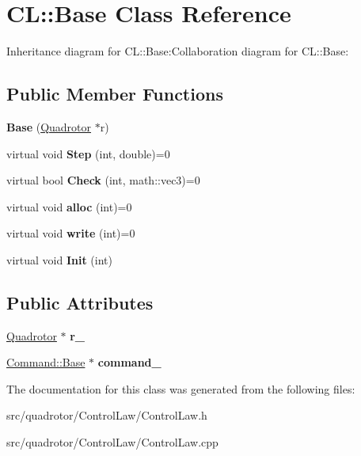 \hypertarget{classCL_1_1Base}{
\section{CL::Base Class Reference}
\label{classCL_1_1Base}
}
Inheritance diagram for CL::Base:Collaboration diagram for CL::Base:\subsection*{Public Member Functions}
\begin{DoxyCompactItemize}
\item 
\hypertarget{classCL_1_1Base_ad8db38f548637316213cd109aed97792}{
{\bfseries Base} (\hyperlink{classQuadrotor}{Quadrotor} $\ast$r)}
\label{classCL_1_1Base_ad8db38f548637316213cd109aed97792}

\item 
\hypertarget{classCL_1_1Base_a08bb880fc7c5f5c81ee77eaa9570c32a}{
virtual void {\bfseries Step} (int, double)=0}
\label{classCL_1_1Base_a08bb880fc7c5f5c81ee77eaa9570c32a}

\item 
\hypertarget{classCL_1_1Base_a3de68eff20bc897fea32c758bff81d03}{
virtual bool {\bfseries Check} (int, math::vec3)=0}
\label{classCL_1_1Base_a3de68eff20bc897fea32c758bff81d03}

\item 
\hypertarget{classCL_1_1Base_ab4f3f33c7eb3869ca36490255600c3a5}{
virtual void {\bfseries alloc} (int)=0}
\label{classCL_1_1Base_ab4f3f33c7eb3869ca36490255600c3a5}

\item 
\hypertarget{classCL_1_1Base_ab23d401d25f004ee0e7ef20a591a6ba2}{
virtual void {\bfseries write} (int)=0}
\label{classCL_1_1Base_ab23d401d25f004ee0e7ef20a591a6ba2}

\item 
\hypertarget{classCL_1_1Base_acbc68636ede90524743ffb85dd41aa0c}{
virtual void {\bfseries Init} (int)}
\label{classCL_1_1Base_acbc68636ede90524743ffb85dd41aa0c}

\end{DoxyCompactItemize}
\subsection*{Public Attributes}
\begin{DoxyCompactItemize}
\item 
\hypertarget{classCL_1_1Base_ad96040f9fcd19572e9e73dbafc62f801}{
\hyperlink{classQuadrotor}{Quadrotor} $\ast$ {\bfseries r\_\-}}
\label{classCL_1_1Base_ad96040f9fcd19572e9e73dbafc62f801}

\item 
\hypertarget{classCL_1_1Base_aacd59a4cfd28c0bb1fbb468193cf8780}{
\hyperlink{classCommand_1_1Base}{Command::Base} $\ast$ {\bfseries command\_\-}}
\label{classCL_1_1Base_aacd59a4cfd28c0bb1fbb468193cf8780}

\end{DoxyCompactItemize}


The documentation for this class was generated from the following files:\begin{DoxyCompactItemize}
\item 
src/quadrotor/ControlLaw/ControlLaw.h\item 
src/quadrotor/ControlLaw/ControlLaw.cpp\end{DoxyCompactItemize}
